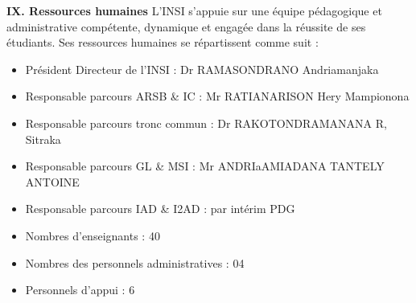 \documentclass[a4paper,12pt]{book}
\begin{document}
\textbf{IX. Ressources humaines} 
L’INSI s’appuie sur une équipe pédagogique et administrative compétente, dynamique et engagée dans la réussite de ses étudiants. Ses ressources humaines se répartissent comme suit :
\begin{itemize}
    \item Président Directeur de l’INSI : Dr RAMASONDRANO Andriamanjaka
    \item Responsable parcours ARSB \& IC : Mr RATIANARISON Hery Mampionona
    \item Responsable parcours tronc commun : Dr RAKOTONDRAMANANA R, Sitraka
    \item Responsable parcours GL \& MSI : Mr ANDRIaAMIADANA TANTELY ANTOINE
    \item Responsable parcours IAD \& I2AD : par intérim PDG
    \item Nombres d'enseignants : 40
    \item Nombres des personnels administratives : 04
    \item Personnels d’appui : 6
\end{itemize}
\end{document}
